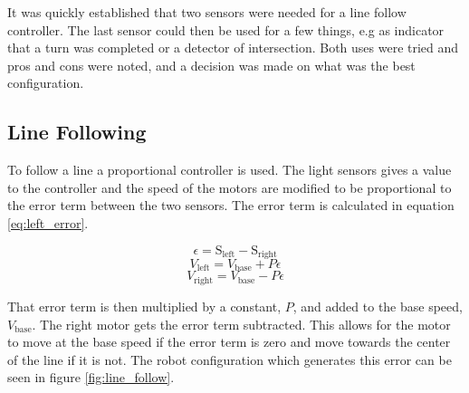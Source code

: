 It was quickly established that two sensors were needed for a line follow controller. The last sensor could then be used for a few things, e.g as indicator that a turn was completed or a detector of intersection. Both uses were tried and pros and cons were noted, and a decision was made on what was the best configuration. 

\subsection{Line Following}
To follow a line a proportional controller is used.
The light sensors gives a value to the controller and the speed of the motors are modified to be proportional to the error term between the two sensors.
The error term is calculated in equation \ref{eq:left_error}.

\begin{equation}
  \epsilon = \text{S}_{\text{left}} - \text{S}_{\text{right}}
 \label{eq:left_error}
\end{equation}
\begin{equation}
  V_\text{left} = V_\text{base} + P \epsilon
 \label{eq:left_speed}
\end{equation}
\begin{equation}
  V_\text{right} = V_\text{base} - P \epsilon
 \label{eq:right_speed}
\end{equation}

That error term is then multiplied by a constant, $P$, and added to the base speed, $V_\text{base}$.
The right motor gets the error term subtracted.
This allows for the motor to move at the base speed if the error term is zero and move towards the center of the line if it is not.
The robot configuration which generates this error can be seen in figure \ref{fig:line_follow}.

